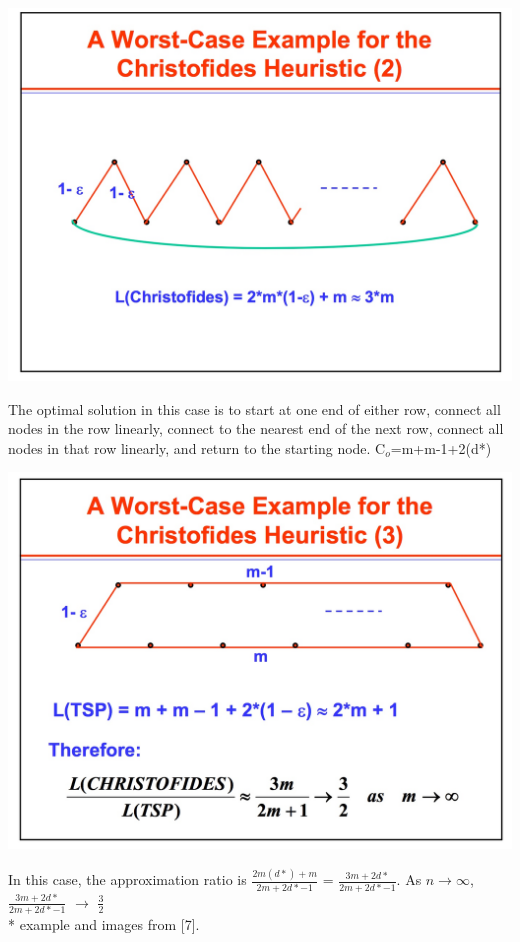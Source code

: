 \documentclass[12pt, oneside]{article}   	%
\begin{document}
\begin{center}
\includegraphics[scale=0.2]{worst2}
\end{center}
\indent The optimal solution in this case is to start at one end of either row, connect all nodes in the row linearly, connect to the nearest end of the next row, connect all nodes in that row linearly, and return to the starting node. C$_o$=m+m-1+2(d*)\\
\begin{center}
\includegraphics[scale=0.2]{worst3}
\end{center}
\indent In this case, the approximation ratio is $\frac{2m(d*)+m}{2m+2d*-1}$ =  $\frac{3m + 2d*}{2m + 2d* -1}$.  As $n \rightarrow \infty$, $\frac{3m + 2d*}{2m + 2d* -1}$ $\rightarrow$ $\frac{3}{2}$\\
* example and images from [7].\\
\end{document}
